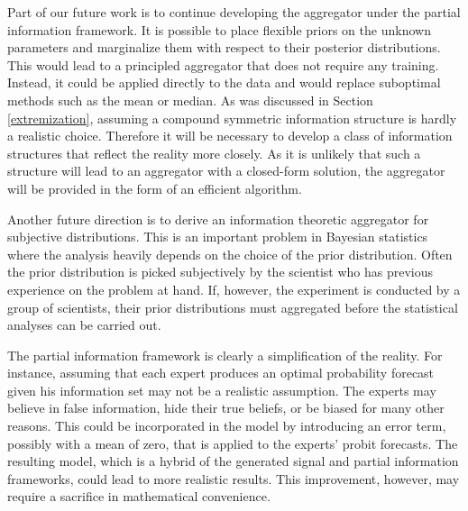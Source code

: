 \documentclass[11pt,twoside]{article}
\begin{document}
Part of our future work is to continue developing the aggregator under the partial information framework. It is possible to place flexible priors on the unknown parameters and marginalize them with respect to their posterior distributions. This would lead to a principled aggregator that does not require any training. Instead, it could be applied directly to the data and would replace suboptimal methods such as the mean or median. As was discussed in Section \ref{extremization}, assuming a compound symmetric information structure is hardly a realistic choice. Therefore it will be necessary to develop a class of information structures that reflect the reality more closely. As it is unlikely that such a structure will lead to an aggregator with a closed-form solution, the aggregator will be provided in the form of an efficient algorithm.

Another future direction is to derive an information theoretic aggregator for subjective distributions. This is an important problem in Bayesian statistics where the analysis heavily depends on the choice of the prior distribution. Often the prior distribution is picked subjectively by the scientist who has previous experience on the problem at hand. If, however, the experiment is conducted by a group of scientists, their prior distributions must aggregated before the statistical analyses can be carried out. 
 
The partial information framework is clearly a simplification of the reality. For instance, assuming that each expert produces an optimal probability forecast given his information set may not be a realistic assumption. The experts may believe in false information, hide their true beliefs, or be biased for many other reasons. This could be incorporated in the model by introducing an error term, possibly with a mean of zero, that is applied to the experts' probit forecasts. The resulting model, which is a hybrid of the generated signal and partial information frameworks, could lead to more realistic results. This improvement, however, may require a sacrifice in mathematical convenience. 


%

\end{document}
